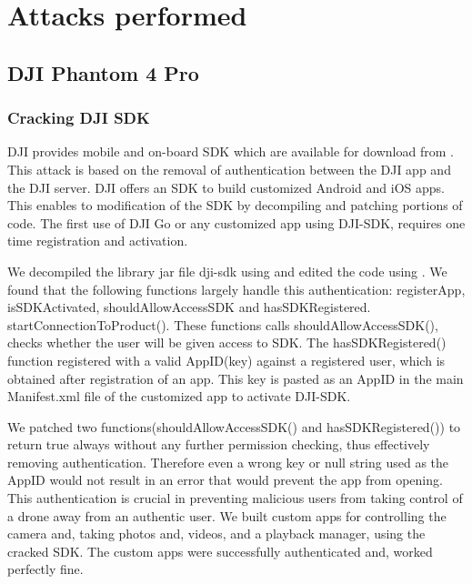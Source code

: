 \documentclass[conference]{IEEEtran}
\begin{document}
\section{Attacks performed}\label{Attacks performed}

\subsection{DJI Phantom 4 Pro}
\subsubsection{Cracking DJI SDK}
DJI provides mobile and on-board SDK which are available for download from \cite{djisdk}.
This attack is based on the removal of authentication between the DJI app and the DJI server. DJI offers an SDK to build customized Android and iOS apps. This enables to modification of the SDK by decompiling and patching portions of code. The first use of DJI Go or any customized app using DJI-SDK, requires one time registration and activation. 


We decompiled the library jar file dji-sdk using \cite{jdgui} and edited the code using \cite{jbe}. 
We found that the following functions largely handle this authentication: registerApp, isSDKActivated,  shouldAllowAccessSDK and hasSDKRegistered. startConnectionToProduct(). These functions calls shouldAllowAccessSDK(), checks whether the user will be given access to SDK. The hasSDKRegistered() function registered with a valid AppID(key) against a registered user, which is obtained after registration of an app. This key is pasted as an AppID in the main Manifest.xml file of the customized app to activate DJI-SDK.

We patched two functions(shouldAllowAccessSDK() and hasSDKRegistered()) to return true always without any further permission checking, thus effectively removing authentication. Therefore even a wrong key or null string used as the AppID would not result in an error that would prevent the app from opening.
This authentication is crucial in preventing malicious users from taking control of a drone away from an authentic user.
We built custom apps for controlling the camera and, taking photos and, videos, and a playback manager, using the cracked SDK. The custom apps were successfully authenticated and, worked perfectly fine.
\end{document}
